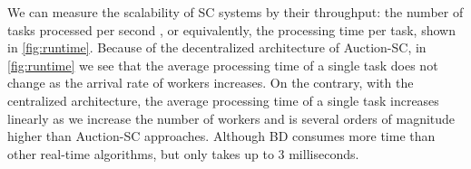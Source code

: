 We can measure the scalability of SC systems by their throughput: the number of tasks processed per second , or equivalently, the processing time per task, shown in \cref{fig:runtime}. Because of the decentralized architecture of Auction-SC, in \cref{fig:runtime} we see that the average processing time of a single task does not change as the arrival rate of workers increases. On the contrary, with the centralized architecture, the average processing time of a single task increases linearly as we increase the number of workers and is several orders of magnitude higher than Auction-SC approaches. Although BD consumes more time than other real-time algorithms, but only takes up to 3 milliseconds.

\begin{figure}[h]
    \centering
\end{figure}
